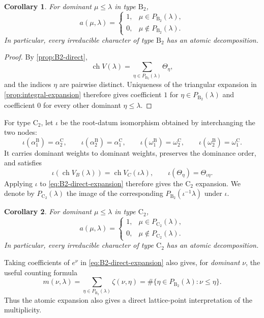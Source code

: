 \documentclass[11pt]{article}
\newtheorem{corollary}[corollary]{Corollary}
\theoremstyle{definition}
\theoremstyle{remark}
\newcommand{\chr}{\operatorname{ch}}
\newcommand{\typeB}{\ensuremath{\mathrm{B}}}
\newcommand{\typeC}{\ensuremath{\mathrm{C}}}
\begin{document}
\begin{corollary}\label{cor:B2-atomic}
For dominant $\mu\le\lambda$ in type $\typeB_2$,
\[
 a(\mu,\lambda)=
 \begin{cases}
   1,&\mu\in P_{\typeB_2}(\lambda),\\
   0,&\mu\notin P_{\typeB_2}(\lambda).
 \end{cases}
\]
In particular, every irreducible character of type $\typeB_2$ has an atomic
decomposition.
\end{corollary}

\begin{proof}
By \cref{prop:B2-direct},
\[
   \chr V(\lambda)=\sum_{\eta\in P_{\typeB_2}(\lambda)}\Theta_\eta,
\]
and the indices $\eta$ are pairwise distinct.  Uniqueness of the triangular
expansion in \cref{prop:integral-expansion} therefore gives coefficient $1$
for $\eta\in P_{\typeB_2}(\lambda)$ and coefficient $0$ for every other
dominant $\eta\le\lambda$.
\end{proof}

For type $\typeC_2$, let $\iota$ be the root-datum isomorphism obtained by
interchanging the two nodes:
\[
 \iota(\alpha_1^{\typeB})=\alpha_2^{\typeC},\qquad
 \iota(\alpha_2^{\typeB})=\alpha_1^{\typeC},\qquad
 \iota(\omega_1^{\typeB})=\omega_2^{\typeC},\qquad
 \iota(\omega_2^{\typeB})=\omega_1^{\typeC}.
\]
It carries dominant weights to dominant weights, preserves the dominance
order, and satisfies
\[
 \iota\!\left(\chr V_B(\lambda)\right)=\chr V_C(\iota\lambda),
 \qquad
 \iota(\Theta_\eta)=\Theta_{\iota\eta}.
\]
Applying $\iota$ to \eqref{eq:B2-direct-expansion} therefore gives the
$\typeC_2$ expansion.  We denote by $P_{\typeC_2}(\lambda)$ the image of the
corresponding $P_{\typeB_2}(\iota^{-1}\lambda)$ under $\iota$.

\begin{corollary}\label{cor:C2-atomic}
For dominant $\mu\le\lambda$ in type $\typeC_2$,
\[
 a(\mu,\lambda)=
 \begin{cases}
   1,&\mu\in P_{\typeC_2}(\lambda),\\
   0,&\mu\notin P_{\typeC_2}(\lambda).
 \end{cases}
\]
In particular, every irreducible character of type $\typeC_2$ has an atomic
decomposition.
\end{corollary}

Taking coefficients of $e^\nu$ in \eqref{eq:B2-direct-expansion} also gives,
for \emph{dominant} $\nu$, the useful counting formula
\begin{equation}\label{eq:B2-multiplicity-count}
 m(\nu,\lambda)
   =\sum_{\eta\in P_{\typeB_2}(\lambda)}\zeta(\nu,\eta)
   =\#\{\eta\in P_{\typeB_2}(\lambda):\nu\le\eta\}.
\end{equation}
Thus the atomic expansion also gives a direct lattice-point interpretation of the multiplicity.
\end{document}
